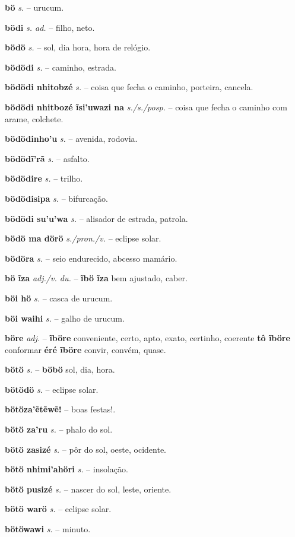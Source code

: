 \textbf{bö} \textit{s.} -- urucum.

\textbf{bödi} \textit{s. ad.} -- filho, neto.

\textbf{bödö} \textit{s.} -- sol, dia hora, hora de relógio.

\textbf{bödödi} \textit{s.} -- caminho, estrada.

\textbf{bödödi nhitobzé} \textit{s.} -- coisa que fecha o caminho, porteira, cancela.

\textbf{bödödi nhitbozé ĩsi'uwazi na} \textit{s./s./posp.} -- coisa que fecha o caminho com arame, colchete.

\textbf{bödödinho'u} \textit{s.} -- avenida, rodovia.

\textbf{bödödĩ'rã} \textit{s.} -- asfalto.

\textbf{bödödire} \textit{s.} -- trilho.

\textbf{bödödisipa} \textit{s.} -- bifurcação.

\textbf{bödödi su'u'wa} \textit{s.} -- alisador de estrada, patrola.

\textbf{bödö ma dörö} \textit{s./pron./v.} -- eclipse solar.

\textbf{bödöra} \textit{s.} -- seio endurecido, abcesso mamário.

\textbf{bö ĩza} \textit{adj./v. du.} -- \textbf{ĩbö ĩza} bem ajustado, caber.

\textbf{böi hö} \textit{s.} -- casca de urucum.

\textbf{böi waihi} \textit{s.} -- galho de urucum.

\textbf{böre} \textit{adj.} -- \textbf{ĩböre} conveniente, certo, apto, exato, certinho, coerente  \textbf{tô ĩböre} conformar  \textbf{éré ĩböre} convir, convém, quase.

\textbf{bötö} \textit{s.} -- \textbf{böbö} sol, dia, hora.

\textbf{bötödö} \textit{s.} -- eclipse solar.

\textbf{bötöza'ẽtẽwẽ!} -- boas festas!.

\textbf{bötö za'ru} \textit{s.} -- phalo do sol.

\textbf{bötö zasizé} \textit{s.} -- pôr do sol, oeste, ocidente.

\textbf{bötö nhimi'ahöri} \textit{s.} -- insolação.

\textbf{bötö pusizé} \textit{s.} -- nascer do sol, leste, oriente.

\textbf{bötö warö} \textit{s.} -- eclipse solar.

\textbf{bötöwawi} \textit{s.} -- minuto.

